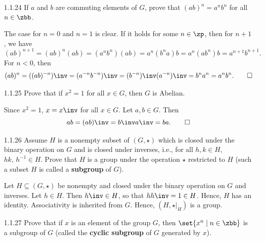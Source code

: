 \begin{exercise}{1.1.24}
    If $a$ and $b$ are commuting elements of $G$, prove that $(ab)^n = a^n b^n$ for all $n \in \zbb$. 
    
\end{exercise}

\begin{sol}
    The case for $n = 0$ and $n = 1$ is clear.
	If it holds for some $n \in \zp$, then for $n + 1$, we have
    \[
    	(ab)^{n + 1} = (ab)^n (ab) = (a^n b^n)(ab) = a^n (b^n a) b = a^n (ab^n) b = a^{n + 1} b^{n + 1}.
    \]
    For $n < 0$, then
    \[
        (ab)^n = ((ab)^{-n})\inv = (a^{-n} b^{-n})\inv = (b^{-n})\inv (a^{-n})\inv = b^n a^n = a^n b^n. \qedhere
    \]
\end{sol}

\begin{exercise}{1.1.25}
    Prove that if $x^2 = 1$ for all $x \in G$, then $G$ is Abelian.
\end{exercise}

\begin{sol}
    Since $x^2 = 1$, $x = x\inv$ for all $x \in G$.
	Let $a, b \in G$.
	Then
    \[
    	ab = (ab)\inv = b\inv a\inv = ba. \qedhere
    \]
\end{sol}

\begin{spex}{1.1.26}
    Assume $H$ is a nonempty subset of $(G, \star)$ which is closed under the binary operation on $G$ and is closed under inverses, i.e., for all $h, k \in H$, $hk, \, h^{-1} \in H$.
	Prove that $H$ is a group under the operation $\star$ restricted to $H$ (such a subset $H$ is called a \textbf{subgroup} of $G$).
\end{spex}

\begin{sol}[spsol]
    Let $H \subseteq (G, \star)$ be nonempty and closed under the binary operation on $G$ and inverses.
	Let $h \in H$.
	Then $h\inv \in H$, so that $hh\inv = 1 \in H$.
	Hence, $H$ has an identity.
	Associativity is inherited from $G$.
	Hence, $(H, \star|_H)$ is a group.
\end{sol}

\begin{spex}{1.1.27}
    Prove that if $x$ is an element of the group $G$, then $\set{x^n \mid n \in \zbb }$ is a subgroup of $G$ (called the \textbf{cyclic subgroup} of $G$ generated by $x$).
\end{spex}

